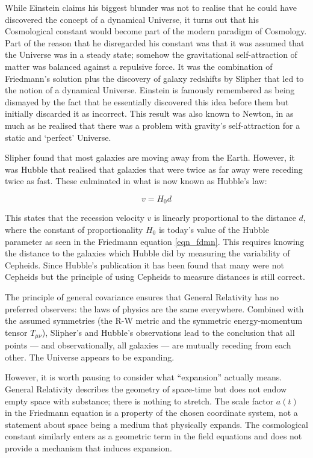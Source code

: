 While Einstein claims his biggest blunder was not to realise that he could have discovered the concept of a dynamical Universe, it turns out that his Cosmological constant would become part of the modern paradigm of Cosmology. Part of the reason that he disregarded his constant was that it was assumed that the Universe was in a steady state; somehow the gravitational self-attraction of matter was balanced against a repulsive force. It was the combination of Friedmann's solution plus the discovery of galaxy redshifts by Slipher \citep{bib_sli} that led to the notion of a dynamical Universe. Einstein is famously remembered as being dismayed by the fact that he essentially discovered this idea before them but initially discarded it as incorrect. This result was also known to Newton, in as much as he realised that there was a problem with gravity's self-attraction for a static and `perfect' Universe.

Slipher found that most galaxies are moving away from the Earth. However, it was Hubble \citep{bib_hub} that realised that galaxies that were twice as far away were receding twice as fast. These culminated in what is now known as Hubble's law:

\begin{equation}
 v = H_0 d 
\end{equation}

\noindent This states that the recession velocity $v$ is linearly proportional to the distance $d$, where the constant of proportionality $H_0$ is today's value of the Hubble parameter as seen in the Friedmann equation \ref{eqn_fdmn}. This requires knowing the distance to the galaxies which Hubble did by measuring the variability of Cepheids. Since Hubble's publication it has been found that many were not Cepheids but the principle of using Cepheids to measure distances is still correct.

The principle of general covariance ensures that General Relativity has no preferred observers: the laws of physics are the same everywhere. Combined with the assumed symmetries (the R-W metric and the symmetric energy-momentum tensor $T_{\mu\nu}$), Slipher's and Hubble's observations lead to the conclusion that all points --- and observationally, all galaxies --- are mutually receding from each other. The Universe appears to be expanding.

However, it is worth pausing to consider what ``expansion'' actually means. General Relativity describes the geometry of space-time but does not endow empty space with substance; there is nothing to stretch. The scale factor $a(t)$ in the Friedmann equation is a property of the chosen coordinate system, not a statement about space being a medium that physically expands. The cosmological constant similarly enters as a geometric term in the field equations and does not provide a mechanism that induces expansion.

